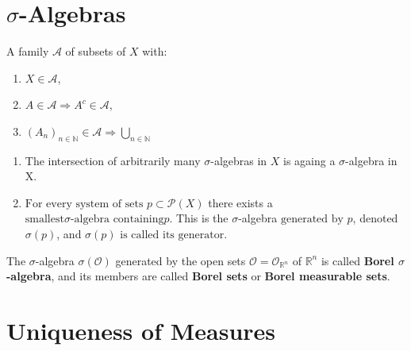 \section{\(\sigma\)-Algebras}
\begin{definition}
    A family \(\mathscr{A}\) of subsets of \(X\) with:
    \begin{enumerate}[label=(\roman*)]
        \item \(X\in\mathscr{A}\), \label{ax:sigma1}
        \item \(A\in\mathscr{A} \Rightarrow A^c \in\mathscr{A}\), \label{ax:sigma2}
        \item \(\left( A_n \right)_{n\in\mathbb{N}} \in\mathscr{A} \Rightarrow \bigcup\limits_{n\in\mathbb{N}} \)
    \end{enumerate}
\end{definition}
\begin{theorem}
    \quad 

    \begin{enumerate}[label=(\roman*)]
        \item The intersection of arbitrarily many \(\sigma\)-algebras in \(X\) is againg a \(\sigma\)-algebra in X.
        \item \(\text{For every system of sets }p \subset \mathscr{P}(X)\) there exists a 
        \(\text{smallest} \sigma\text{-algebra containing} p. \) This is the \(\sigma\)-algebra
        \(\text{generated by } p\), denoted \(\sigma(p)\), and 
        \(\sigma(p) \text{ is called its generator}\).
    \end{enumerate}
\end{theorem}
\begin{definition}[Borel]
    The \(\sigma\)-algebra \(\sigma(\mathcal{O})\) generated by the open sets \(\mathcal{O} = \mathcal{O}_{\mathbb{R}^n}\) of $\mathbb{R}^n$
    is called \textbf{Borel $\sigma$-algebra}, and its members are called \textbf{Borel sets} or
    \textbf{Borel measurable sets}.
\end{definition}

\section{Uniqueness of Measures}

